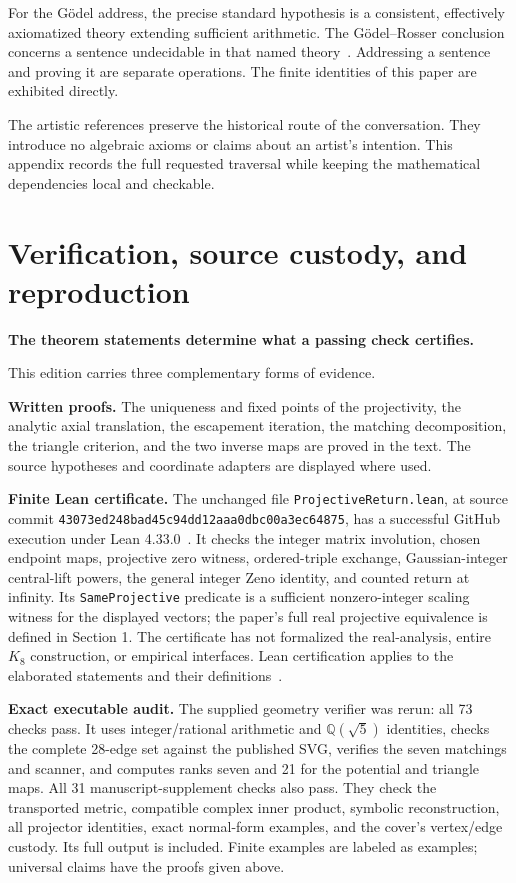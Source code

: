 \documentclass[11pt]{article}
\theoremstyle{definition}\newtheorem{definition}[theorem]{Definition}
\newcommand{\lead}[1]{\textbf{#1}\par}
\newcommand{\page}{\clearpage}
\begin{document}
For the G\"odel address, the precise standard hypothesis is a consistent, effectively axiomatized theory extending sufficient arithmetic. The G\"odel--Rosser conclusion concerns a sentence undecidable in that named theory~\cite{Rosser}. Addressing a sentence and proving it are separate operations. The finite identities of this paper are exhibited directly.

The artistic references preserve the historical route of the conversation. They introduce no algebraic axioms or claims about an artist's intention. This appendix records the full requested traversal while keeping the mathematical dependencies local and checkable.

\page
\section{Verification, source custody, and reproduction}
\lead{The theorem statements determine what a passing check certifies.}
This edition carries three complementary forms of evidence.

\textbf{Written proofs.} The uniqueness and fixed points of the projectivity, the analytic axial translation, the escapement iteration, the matching decomposition, the triangle criterion, and the two inverse maps are proved in the text. The source hypotheses and coordinate adapters are displayed where used.

\textbf{Finite Lean certificate.} The unchanged file \texttt{ProjectiveReturn.lean}, at source commit \texttt{43073ed248\allowbreak bad45c94dd\allowbreak12aaa0dbc0\allowbreak0a3ec64875}, has a successful GitHub execution under Lean 4.33.0~\cite{LeanRun}. It checks the integer matrix involution, chosen endpoint maps, projective zero witness, ordered-triple exchange, Gaussian-integer central-lift powers, the general integer Zeno identity, and counted return at infinity. Its \texttt{SameProjective} predicate is a sufficient nonzero-integer scaling witness for the displayed vectors; the paper's full real projective equivalence is defined in Section 1. The certificate has not formalized the real-analysis, entire $K_8$ construction, or empirical interfaces. Lean certification applies to the elaborated statements and their definitions~\cite{LeanManual}.

\textbf{Exact executable audit.} The supplied geometry verifier was rerun: all 73 checks pass. It uses integer/rational arithmetic and $\mathbb Q(\sqrt5)$ identities, checks the complete 28-edge set against the published SVG, verifies the seven matchings and scanner, and computes ranks seven and 21 for the potential and triangle maps. All 31 manuscript-supplement checks also pass. They check the transported metric, compatible complex inner product, symbolic reconstruction, all projector identities, exact normal-form examples, and the cover's vertex/edge custody. Its full output is included. Finite examples are labeled as examples; universal claims have the proofs given above.
\end{document}
